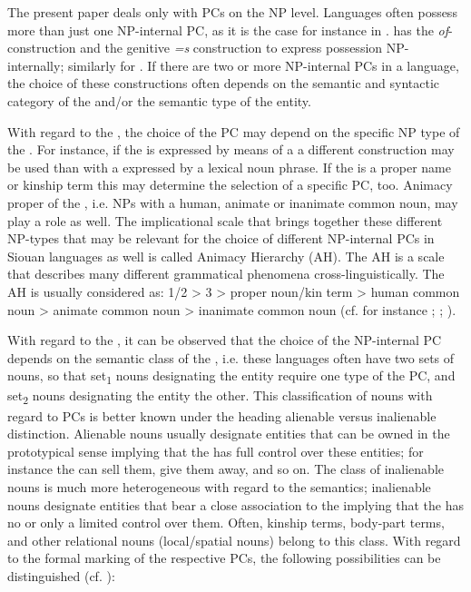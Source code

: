 \documentclass[output=paper]{LSP/langsci}
\begin{document}
The present paper deals only with PCs on the NP level. Languages often possess more than just one NP-internal PC, as it is the case for instance in .  has the \textit{of}-construction and the genitive \textit{=s} construction to express possession NP-internally; similarly for . If there are two or more NP-internal PCs in a language, the choice of these constructions often depends on the semantic and syntactic category of the  and/or the semantic type of the  entity. 

With regard to the , the choice of the PC may depend on the specific NP type of the . For instance, if the  is expressed by means of a  a different construction may be used than with a  expressed by a lexical noun phrase. If the  is a proper name or kinship term this may determine the selection of a specific PC, too. Animacy proper of the , i.e.  NPs with a human, animate or inanimate common noun, may play a role as well. The implicational scale that brings together these different NP-types that may be relevant for the choice of different NP-internal PCs in Siouan languages as well is called Animacy Hierarchy (AH). The AH is a scale that describes many different grammatical phenomena cross-linguistically. The AH is usually considered as: 1/2 > 3 > proper noun/kin term > human common noun > animate common noun > inanimate common noun (cf. for instance \citealt{Dixon1979}; \citealt{Comrie1981}; \citealt{Croft2003}).

With regard to the , it can be observed that the choice of the NP-internal PC depends on the semantic class of the , i.e. these languages often have two sets of nouns, so that set\textsubscript{1} nouns designating the  entity require one type of the PC, and set\textsubscript{2} nouns designating the  entity the other. This classification of nouns with regard to PCs is better known under the heading alienable versus inalienable distinction. Alienable nouns usually designate entities that can be owned in the prototypical sense implying that the  has full control over these  entities; for instance the  can sell them, give them away, and so on. The class of inalienable nouns is much more heterogeneous with regard to the semantics; inalienable nouns designate entities that bear a close association to the  implying that the  has no or only a limited control over them. Often, kinship terms, body-part terms, and other relational nouns (local/spatial nouns) belong to this class. 
With regard to the formal marking of the respective PCs, the following possibilities can be distinguished (cf. \citealt[286--290]{Dixon2010}):
\end{document}
